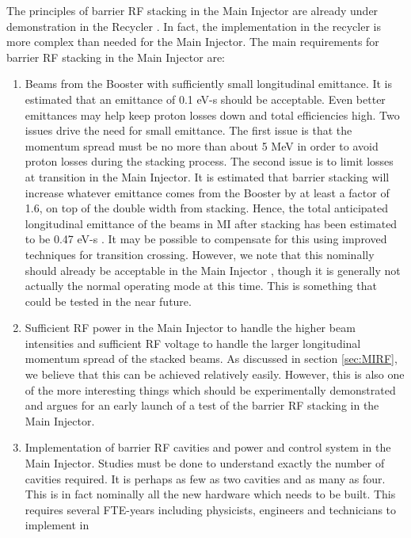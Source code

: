 \documentclass{article}
\begin{document}
The principles of barrier RF stacking in the Main Injector are already under
demonstration in the Recycler \cite {Recycler}. 
In fact, the implementation in the recycler is
more complex than needed for the Main Injector. The main requirements for
barrier RF stacking in the Main Injector are:
\begin {enumerate}
\item Beams from the Booster with sufficiently small longitudinal emittance.
      It is estimated that an emittance of 0.1 eV-s should be acceptable.
      Even better emittances may help keep proton losses down and total
      efficiencies high. Two issues drive the need for small emittance.
      The first issue is that the momentum spread must be no more than
      about 5 MeV in order to avoid proton losses during the stacking
      process. The second issue is to limit losses at transition
      in the Main Injector. It
      is estimated that barrier stacking will increase whatever emittance
      comes from the Booster by at least a factor of 1.6, on top of
      the double width from stacking. Hence, the total anticipated
      longitudinal emittance of the beams in MI after stacking has been
      estimated to be 0.47 eV-s \cite {Ng}. It may be possible
      to compensate for this using improved techniques for transition
      crossing. However, we note that this nominally should already be
      acceptable in the Main Injector \cite{MIDesign}, though it is 
      generally not actually
      the normal operating mode at this time. This is something that could
      be tested in the near future.
\item Sufficient RF power in the Main Injector to handle the higher beam
      intensities and sufficient RF voltage to handle the larger longitudinal
      momentum spread of the stacked beams. As discussed in section 
      \ref {sec:MIRF}, we believe that this can be achieved relatively
      easily. However, this is also one of the more interesting things
      which should be experimentally demonstrated and argues for an early
      launch of a test of the barrier RF stacking in the Main Injector.
\item Implementation of barrier RF cavities and power and control
      system in the Main Injector. Studies must be done to understand
      exactly the number of cavities required. It is perhaps as few as two
      cavities and as many as four. This is in fact nominally all the new
      hardware which needs to be built. This requires several FTE-years
      including physicists, engineers and technicians to implement in

\end{enumerate}
\end{document}
